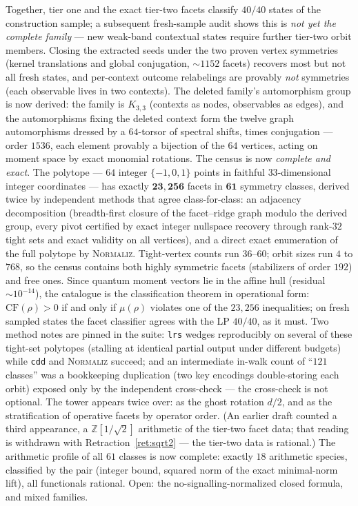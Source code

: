 \documentclass[11pt]{article}
\theoremstyle{remark}
\theoremstyle{plain}
\begin{document}
Together, tier one and the exact tier-two facets classify $40/40$ states of the
construction sample; a subsequent fresh-sample audit shows this is \emph{not yet the
complete family} --- new weak-band contextual states require further tier-two orbit
members. Closing the extracted seeds under the two proven vertex symmetries (kernel
translations and global conjugation, $\sim\!1152$ facets) recovers most but not all
fresh states, and per-context outcome relabelings are provably \emph{not} symmetries
(each observable lives in two contexts). The deleted family's automorphism group is now derived: the family is $K_{3,3}$
(contexts as nodes, observables as edges), and the automorphisms fixing the deleted
context form the twelve graph automorphisms dressed by a $64$-torsor of spectral
shifts, times conjugation --- order $1536$, each element provably a bijection of the
$64$ vertices, acting on moment space by exact monomial rotations. The census is now \emph{complete and exact}. The polytope --- $64$ integer
$\{-1,0,1\}$ points in faithful $33$-dimensional integer coordinates --- has exactly
$\mathbf{23{,}256}$ facets in $\mathbf{61}$ symmetry classes, derived twice by
independent methods that agree class-for-class: an adjacency decomposition (breadth-first
closure of the facet--ridge graph modulo the derived group, every pivot certified by
exact integer nullspace recovery through rank-$32$ tight sets and exact validity on all
vertices), and a direct exact enumeration of the full polytope by \textsc{Normaliz}.
Tight-vertex counts run $36$--$60$; orbit sizes run $4$ to $768$, so the census contains
both highly symmetric facets (stabilizers of order $192$) and free ones. Since quantum
moment vectors lie in the affine hull (residual $\sim 10^{-14}$), the catalogue is the
classification theorem in operational form: $\mathrm{CF}(\rho)>0$ if and only if
$\mu(\rho)$ violates one of the $23{,}256$ inequalities; on fresh sampled states the
facet classifier agrees with the LP $40/40$, as it must. Two method notes are pinned in
the suite: \texttt{lrs} wedges reproducibly on several of these tight-set polytopes
(stalling at identical partial output under different budgets) while \texttt{cdd} and
\textsc{Normaliz} succeed; and an intermediate in-walk count of ``$121$ classes''
was a bookkeeping duplication (two key encodings double-storing each orbit) exposed
only by the independent cross-check --- the cross-check is not optional. The tower
appears twice over: as the ghost rotation $d/2$, and as the stratification of operative
facets by operator order. (An earlier draft counted a third appearance, a
$\mathbb Z[1/\sqrt2]$ arithmetic of the tier-two facet data; that reading is withdrawn
with Retraction~\ref{ret:sqrt2} --- the tier-two data is rational.) The arithmetic profile
of all $61$ classes is now complete: exactly $18$ arithmetic species, classified by the
pair (integer bound, squared norm of the exact minimal-norm lift), all functionals
rational. Open: the no-signalling-normalized closed formula, and mixed families.
\end{document}
